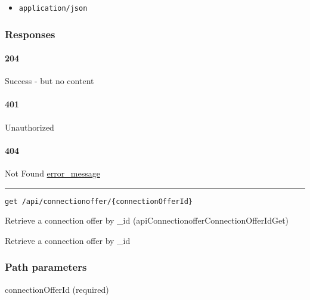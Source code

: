 \begin{itemize}
\tightlist
\item
  \texttt{application/json}
\end{itemize}

\hypertarget{responses-48}{%
\subsubsection{Responses}\label{responses-48}}

\hypertarget{section-158}{%
\paragraph{204}\label{section-158}}

Success - but no content \protect\hyperlink{}{}

\hypertarget{section-159}{%
\paragraph{401}\label{section-159}}

Unauthorized \protect\hyperlink{}{}

\hypertarget{section-160}{%
\paragraph{404}\label{section-160}}

Not Found \protect\hyperlink{error_message}{error\_message}

\begin{center}\rule{0.5\linewidth}{\linethickness}\end{center}

\protect\hypertarget{apiConnectionofferConnectionOfferIdGet}{}{}

\begin{verbatim}
get /api/connectionoffer/{connectionOfferId}
\end{verbatim}

Retrieve a connection offer by \_id
({apiConnectionofferConnectionOfferIdGet})

Retrieve a connection offer by \_id

\hypertarget{path-parameters-26}{%
\subsubsection{Path parameters}\label{path-parameters-26}}

connectionOfferId (required)

